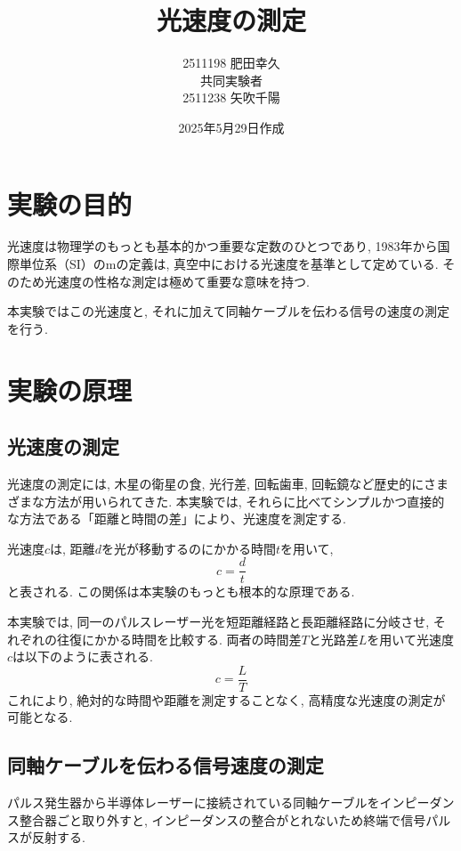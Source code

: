 \documentclass{jarticle}
\title{光速度の測定}
\author{2511198 肥田幸久 \\ 共同実験者 \\ 2511238 矢吹千陽}
\date{2025年5月29日作成}
\begin{document}
\maketitle



\section{実験の目的}
光速度は物理学のもっとも基本的かつ重要な定数のひとつであり, 1983年から国際単位系（SI）の$\mathrm{m}$の定義は, 真空中における光速度を基準として定めている. そのため光速度の性格な測定は極めて重要な意味を持つ.

本実験ではこの光速度と, それに加えて同軸ケーブルを伝わる信号の速度の測定を行う.



\section{実験の原理}


\subsection{光速度の測定}

光速度の測定には, 木星の衛星の食, 光行差, 回転歯車, 回転鏡など歴史的にさまざまな方法が用いられてきた. 本実験では, それらに比べてシンプルかつ直接的な方法である「距離と時間の差」により、光速度を測定する.

光速度$c$は, 距離$d$を光が移動するのにかかる時間$t$を用いて,
\begin{equation}
  c=\frac{d}{t}
\end{equation}
と表される. この関係は本実験のもっとも根本的な原理である.

本実験では, 同一のパルスレーザー光を短距離経路と長距離経路に分岐させ, それぞれの往復にかかる時間を比較する. 両者の時間差$T$と光路差$L$を用いて光速度$c$は以下のように表される.
\begin{equation}
  c=\frac{L}{T}
\end{equation}
これにより, 絶対的な時間や距離を測定することなく, 高精度な光速度の測定が可能となる.


\subsection{同軸ケーブルを伝わる信号速度の測定}

パルス発生器から半導体レーザーに接続されている同軸ケーブルをインピーダンス整合器ごと取り外すと, インピーダンスの整合がとれないため終端で信号パルスが反射する.
\end{document}
